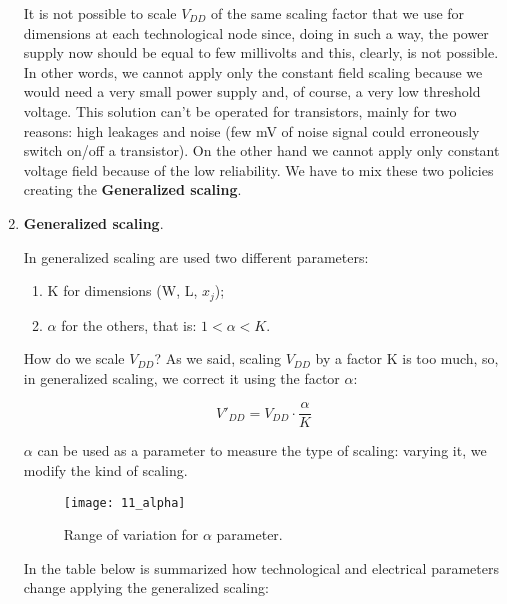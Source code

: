 \documentclass[a4paper, 12pt, twoside, openright]{report}
\begin{document}
\begin{enumerate}
It is not possible to scale $V_{DD}$ of the same scaling factor that we use for dimensions at each technological node since, doing in such a way, the power supply now should be equal to few millivolts and this, clearly, is not possible. In other words, we cannot apply only the constant field scaling because we would need a very small power supply and, of course, a very low threshold voltage. This solution can't be operated for transistors, mainly for two reasons: high leakages and noise (few mV of noise signal could erroneously switch on/off a transistor). On the other hand we cannot apply only constant voltage field because of the low reliability. We have to mix these two policies creating the \textbf{Generalized scaling}.

\newpage

\item \textbf{Generalized scaling}.

In generalized scaling are used two different parameters:

	\begin{enumerate}
	\item K for dimensions (W, L, $x_{j}$);
	\item $\alpha$ for the others, that is: $1< \alpha < K$.
	\end{enumerate}

How do we scale $V_{DD}$? As we said, scaling $V_{DD}$ by a factor K is too much, so, in generalized scaling, we correct it using the factor $\alpha$:

	\begin{equation}
	V'_{DD} = V_{DD} \cdot \frac{\alpha}{K}
	\end{equation}

$\alpha$ can be used as a parameter to measure the type of scaling: varying it, we modify the kind of scaling.

	\begin{figure}[H]
	\centering
	\texttt{[image: 11\_alpha]}
	\caption{Range of variation for $\alpha$ parameter.}
	\label{}
	\end{figure}

In the table below is summarized how technological and electrical parameters change applying the generalized scaling:


\end{enumerate}
\end{document}
